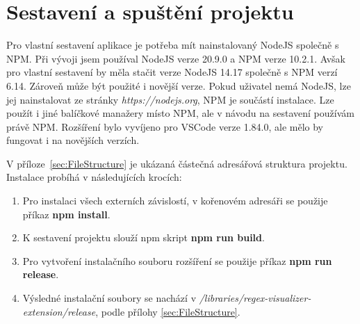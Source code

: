 \documentclass[czech,bachelor]{diploma}
\begin{document}
\MakeTitlePages

\listoffigures
\clearpage

\listofcode
\clearpage

\listoftables
\clearpage










\printbibliography[title={Literatura}, heading=bibintoc]

\appendix

\chapter{Sestavení a spuštění projektu}\label{sec:ProjectBuild}

Pro vlastní sestavení aplikace je potřeba mít nainstalovaný NodeJS společně s NPM.
Při vývoji jsem používal NodeJS verze 20.9.0 a NPM verze 10.2.1.
Avšak pro vlastní sestavení by měla stačit verze NodeJS 14.17 společně s NPM verzí 6.14.
Zároveň může být použité i novější verze. 
Pokud uživatel nemá NodeJS, lze jej nainstalovat ze stránky \textit{https://nodejs.org}, NPM je součástí instalace.
Lze použít i jiné balíčkové manažery místo NPM, ale v návodu na sestavení používám právě NPM.
Rozšíření bylo vyvíjeno pro VSCode verze 1.84.0, ale mělo by fungovat i na novějších verzích.

V příloze~\ref{sec:FileStructure} je ukázaná částečná adresářová struktura projektu.
Instalace probíhá v následujících krocích:

\begin{enumerate}
	\item Pro instalaci všech externích závislostí, v kořenovém adresáři se použije příkaz \textbf{\textcolor{OliveGreen}{npm install}}.
	\item K sestavení projektu slouží npm skript \textbf{\textcolor{OliveGreen}{npm run build}}.
	\item Pro vytvoření instalačního souboru rozšíření se použije příkaz \textbf{\textcolor{OliveGreen}{npm run release}}.
	\item Výsledné instalační soubory se nachází v \textit{/libraries/regex-visualizer-extension/release}, podle přílohy \ref{sec:FileStructure}.
\end{enumerate}
\end{document}
